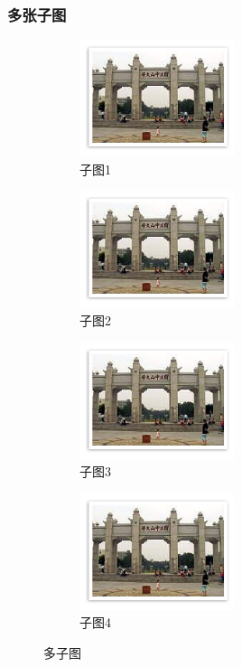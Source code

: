 \subsubsection{多张子图}
\begin{figure}[h!] %
	\begin{subfigure}{0.55\textwidth}
		\centering
		\includegraphics[width=0.5\textwidth]{figure/fig1.png}
		\caption{子图1}
		\label{subfig1}
	\end{subfigure}
	\begin{subfigure}{0.55\textwidth}
		\centering
		\includegraphics[width=0.5\textwidth]{figure/fig1.png} 
		\caption{子图2}
		\label{subfig2}
	\end{subfigure}
	\begin{subfigure}{0.55\textwidth}
		\centering
		\includegraphics[width=0.5\textwidth]{figure/fig1.png}
		\caption{子图3}
		\label{subfig3}
	\end{subfigure}
	\begin{subfigure}{0.55\textwidth}
		\centering
		\includegraphics[width=0.5\textwidth]{figure/fig1.png} 
		\caption{子图4}
		\label{subfig4}
	\end{subfigure}
	\caption{多子图}
	\label{subfig}
\end{figure}
